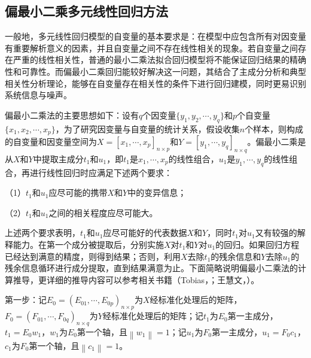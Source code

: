 \subsection{偏最小二乘多元线性回归方法}

一般地，多元线性回归模型的自变量的基本要求是：在模型中应包含所有对因变量有重要解析意义的因素，并且自变量之间不存在线性相关的现象。若自变量之间存在严重的线性相关性，普通的最小二乘法拟合回归模型将不能保证回归结果的精确性和可靠性。而偏最小二乘回归能较好解决这一问题，其结合了主成分分析和典型相关性分析理论，能够在自变量存在相关性的条件下进行回归建模，同时更易识别系统信息与噪声。

偏最小二乘法的主要思想如下：设有$q$个因变量$\{{{y}_{1}},{{y}_{2}},\cdots ,{{y}_{q}}\}$和$p$个自变量$\{{{x}_{1}},{{x}_{2}},\cdots ,{{x}_{p}}\}$，为了研究因变量与自变量的统计关系，假设收集$n$个样本，则构成的自变量和因变量空间为$X={{[{{x}_{1}},\cdots ,{{x}_{p}}]}_{n\times p}}$和$Y={{[{{y}_{1}},\cdots ,{{y}_{q}}]}_{n\times q}}$。偏最小二乘是从$X$和$Y$中提取主成分$t_1$和$u_1$，即$t_1$是${{x}_{1}},\cdots ,{{x}_{p}}$的线性组合，$u_1$是${{y}_{1}},\cdots ,{{y}_{q}}$的线性组合，再进行线性回归时应满足下述两个要求：

（1）$t_1$和$u_1$应尽可能的携带$X$和$Y$中的变异信息；

（2）$t_1$和$u_1$之间的相关程度应尽可能大。

上述两个要求表明，$t_1$和$u_1$应尽可能好的代表数据$X$和$Y$，同时$t_1$对$u_1$又有较强的解释能力。在第一个成分被提取后，分别实施$X$对$t_1$和$Y$对$u_1$的回归。如果回归方程已经达到满意的精度，则得到结果；否则，利用$X$去除$t_1$的残余信息和$Y$去除$u_1$的残余信息循环进行成分提取，直到结果满意为止。下面简略说明偏最小二乘法的计算推导，更详细的推导内容可以参考相关书籍（Tobias，\citeyear{tobias1995introduction}；王慧文，\citeyear{王惠文1999偏最小二乘回归方法及其应用}）。

第一步：记${{E}_{0}}={{({{E}_{01}},\cdots ,{{E}_{0p}})}_{n\times p}}$为$X$经标准化处理后的矩阵，${{F}_{0}}={{({{F}_{01}},\cdots ,{{F}_{0q}})}_{n\times q}}$为$Y$经标准化处理后的矩阵；记$t_1$为${{E}_{0}}$第一主成分，$t_1={E_0}{w_1}$，$w_1$为$E_0$第一个轴，且$\left\| {{w}_{1}} \right\|=1$；记$u_1$为${{F}_{0}}$第一主成分，$u_1={F_0}{c_1}$，$c_1$为$F_0$第一个轴，且$\left\| {{c}_{1}} \right\|=1$。

